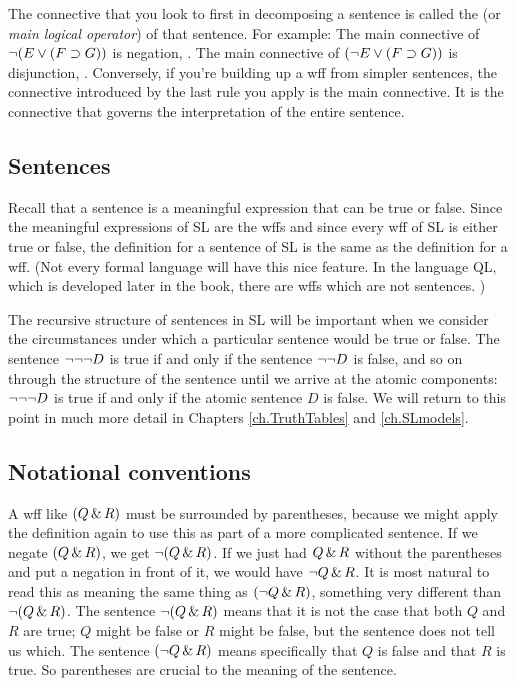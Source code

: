 The connective that you look to first in decomposing a sentence is called the  (or \emph{main logical operator}) of that sentence. For example: The main connective of $\neg (E \vee (F \supset G))$ is negation, \enot. The main connective of $(\neg E \vee (F \supset G))$ is disjunction, \eor. Conversely, if you're building up a wff from simpler sentences, the connective introduced by the last rule you apply is the main connective. It is the connective that governs the interpretation of the entire sentence.


\subsection{Sentences}
Recall that a sentence is a meaningful expression that can be true or false. Since the meaningful expressions of SL are the wffs and since every wff of SL is either true or false, the definition for a sentence of SL is the same as the definition for a wff. (Not every formal language will have this nice feature. In the language QL, which is developed later in the book, there are wffs which are not sentences. )

The recursive structure of sentences in SL will be important when we consider the circumstances under which a particular sentence would be true or false. The sentence $\neg \neg \neg D$ is true if and only if the sentence $\neg \neg D$ is false, and so on through the structure of the sentence until we arrive at the atomic components: $\neg \neg \neg D$ is true if and only if the atomic sentence $D$ is false. We will return to this point in much more detail in Chapters \ref{ch.TruthTables} and \ref{ch.SLmodels}.



\subsection{Notational conventions}
\label{SLconventions}
A wff like $(Q \,\&\, R)$ must be surrounded by parentheses, because we might apply the definition again to use this as part of a more complicated sentence. If we negate $(Q \,\&\, R)$, we get $\neg(Q \,\&\, R)$. If we just had $Q \,\&\, R$ without the parentheses and put a negation in front of it, we would have $\neg Q \,\&\, R$. It is most natural to read this as meaning the same thing as $(\neg Q \,\&\, R)$, something very different than $\neg(Q\,\&\, R)$. The sentence $\neg(Q \,\&\, R)$ means that it is not the case that both $Q$ and $R$ are true; $Q$ might be false or $R$ might be false, but the sentence does not tell us which. The sentence $(\neg Q \,\&\, R)$ means specifically that $Q$ is false and that $R$ is true. So parentheses are crucial to the meaning of the sentence.

